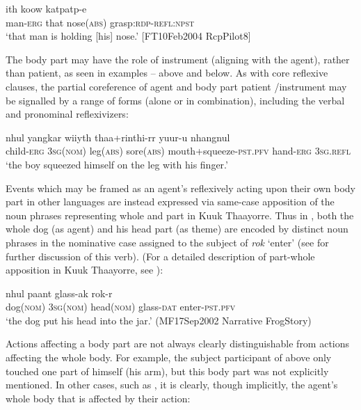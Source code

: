 \documentclass[output=paper]{langscibook}
\begin{document}
\ea 
    \label{ex:Gaby:23}
      {ith}  {koow}  {katpatp-e}\\
    man-\textsc{erg}  that  nose(\textsc{abs})  grasp\textsc{:rdp-refl:npst}\\
    \glt ‘that man is holding [his] nose.’ [FT10Feb2004 RcpPilot8]
    \z
    
    
The body part may have the role of instrument (aligning with the agent), rather than patient, as seen in examples -- above and  below. As with core reflexive clauses, the partial coreference of agent and body part patient /instrument may be signalled by a range of forms (alone or in combination), including the verbal  and pronominal  reflexivizers:

\ea 
    \label{ex:Gaby:24}
      {nhul}  {yangkar}  {wiiyth}  {thaa+rinthi-rr}  {yuur-u}  {nhangnul}\\
    child\textsc{{}-erg}  \textsc{3sg}(\textsc{nom})  leg(\textsc{abs})  sore(\textsc{abs})  mouth+squeeze\textsc{{}-pst.pfv}  hand-\textsc{erg}  \textsc{3sg}.\textsc{refl}\\
    \glt   ‘the boy squeezed himself on the leg with his finger.’ \citep[379]{Hall1972}
    \z


Events which may be framed as an agent’s reflexively acting upon their own body part in other languages are instead expressed via same-case apposition of the noun phrases representing whole and part in Kuuk Thaayorre. Thus in , both the whole dog (as agent) and his head part (as theme) are encoded by distinct noun phrases in the nominative case assigned to the subject of \textit{rok} ‘enter’ (see \textsc{} for further discussion of this verb). (For a detailed description of part-whole apposition in Kuuk Thaayorre, see \citealt[277 ff.]{GabyExperts2017}):

\ea 
    \label{ex:Gaby:25}
      {nhul}  {paant}  {glass-ak}  {rok-r}\\
    dog(\textsc{nom})  \textsc{3sg}(\textsc{nom})  head(\textsc{nom})  glass-\textsc{dat}  enter-\textsc{pst.pfv}\\
    \glt ‘the dog put his head into the jar.’ (MF17Sep2002 Narrative FrogStory)
    \z
    
Actions affecting a body part are not always clearly distinguishable from actions affecting the whole body. For example, the subject participant of  above only touched one part of himself (his arm), but this body part was not explicitly mentioned. In other cases, such as , it is clearly, though implicitly, the agent’s whole body that is affected by their action:
\end{document}
